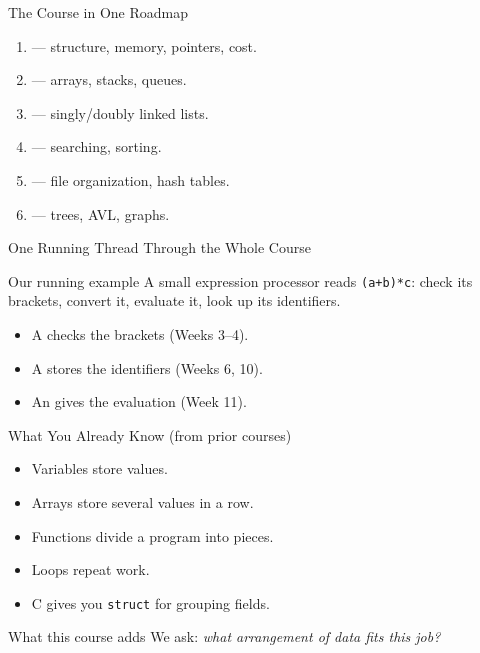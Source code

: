 \documentclass[aspectratio=169]{beamer}
\begin{document}
\begin{frame}{The Course in One Roadmap}
  \begin{enumerate}
    \item {} --- structure, memory, pointers, cost.
    \item {} --- arrays, stacks, queues.
    \item {} --- singly/doubly linked lists.
    \item {} --- searching, sorting.
    \item {} --- file organization, hash tables.
    \item {} --- trees, AVL, graphs.
  \end{enumerate}
  \vspace{0.15cm}
\end{frame}

\begin{frame}{One Running Thread Through the Whole Course}
  \begin{alertblock}{Our running example}
    A small expression processor reads \texttt{(a+b)*c}: check its brackets,
    convert it, evaluate it, look up its identifiers.
  \end{alertblock}
  \begin{itemize}
    \item A  checks the brackets (Weeks 3--4).
    \item A  stores the identifiers (Weeks 6, 10).
    \item An  gives the evaluation (Week 11).
  \end{itemize}
\end{frame}

\begin{frame}{What You Already Know (from prior courses)}
  \begin{itemize}
    \item Variables store values.
    \item Arrays store several values in a row.
    \item Functions divide a program into pieces.
    \item Loops repeat work.
    \item C gives you \texttt{struct} for grouping fields.
  \end{itemize}
  \vspace{0.2cm}
  \begin{exampleblock}{What this course adds}
    We ask: \emph{what arrangement of data fits this job?}
  \end{exampleblock}
\end{frame}
\end{document}
